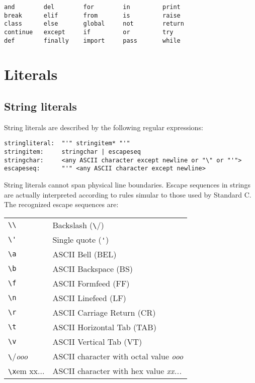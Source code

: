 \begin{verbatim}
and        del        for        in         print
break      elif       from       is         raise
class      else       global     not        return
continue   except     if         or         try
def        finally    import     pass       while
\end{verbatim}


\section{Literals}

\subsection{String literals}

String literals are described by the following regular expressions:

\begin{verbatim}
stringliteral:  "'" stringitem* "'"
stringitem:     stringchar | escapeseq
stringchar:     <any ASCII character except newline or "\" or "'">
escapeseq:      "'" <any ASCII character except newline>
\end{verbatim}

String literals cannot span physical line boundaries.  Escape
sequences in strings are actually interpreted according to rules
simular to those used by Standard C.  The recognized escape sequences
are:

\begin{center}
\begin{tabular}{|l|l|}
\hline
\verb/\\/	& Backslash (\verb/\/) \\
\verb/\'/	& Single quote (\verb/'/) \\
\verb/\a/	& ASCII Bell (BEL) \\
\verb/\b/	& ASCII Backspace (BS) \\
\verb/\f/	& ASCII Formfeed (FF) \\
\verb/\n/	& ASCII Linefeed (LF) \\
\verb/\r/	& ASCII Carriage Return (CR) \\
\verb/\t/	& ASCII Horizontal Tab (TAB) \\
\verb/\v/	& ASCII Vertical Tab (VT) \\
\verb/\/{\em ooo}	& ASCII character with octal value {\em ooo} \\
\verb/\x/{em xx...}	& ASCII character with hex value {\em xx...} \\
\hline
\end{tabular}
\end{center}

